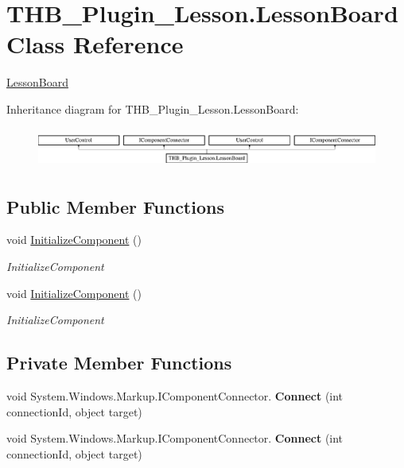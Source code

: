 \hypertarget{class_t_h_b___plugin___lesson_1_1_lesson_board}{}\section{T\+H\+B\+\_\+\+Plugin\+\_\+\+Lesson.\+Lesson\+Board Class Reference}
\label{class_t_h_b___plugin___lesson_1_1_lesson_board}


\mbox{\hyperlink{class_t_h_b___plugin___lesson_1_1_lesson_board}{Lesson\+Board}}  


Inheritance diagram for T\+H\+B\+\_\+\+Plugin\+\_\+\+Lesson.\+Lesson\+Board\+:\begin{figure}[H]
\begin{center}
\leavevmode
\includegraphics[height=1.327014cm]{d1/d3b/class_t_h_b___plugin___lesson_1_1_lesson_board}
\end{center}
\end{figure}
\subsection*{Public Member Functions}
\begin{DoxyCompactItemize}
\item 
void \mbox{\hyperlink{class_t_h_b___plugin___lesson_1_1_lesson_board_aa22da2f78d4cfce95489bdb60c943438}{Initialize\+Component}} ()
\begin{DoxyCompactList}\small\item\em Initialize\+Component \end{DoxyCompactList}\item 
void \mbox{\hyperlink{class_t_h_b___plugin___lesson_1_1_lesson_board_aa22da2f78d4cfce95489bdb60c943438}{Initialize\+Component}} ()
\begin{DoxyCompactList}\small\item\em Initialize\+Component \end{DoxyCompactList}\end{DoxyCompactItemize}
\subsection*{Private Member Functions}
\begin{DoxyCompactItemize}
\item 
\mbox{\label{class_t_h_b___plugin___lesson_1_1_lesson_board_a0c30d214fb143e600203e66bab022b8f}} 
void System.\+Windows.\+Markup.\+I\+Component\+Connector. {\bfseries Connect} (int connection\+Id, object target)
\item 
\mbox{\label{class_t_h_b___plugin___lesson_1_1_lesson_board_a0c30d214fb143e600203e66bab022b8f}} 
void System.\+Windows.\+Markup.\+I\+Component\+Connector. {\bfseries Connect} (int connection\+Id, object target)
\end{DoxyCompactItemize}
